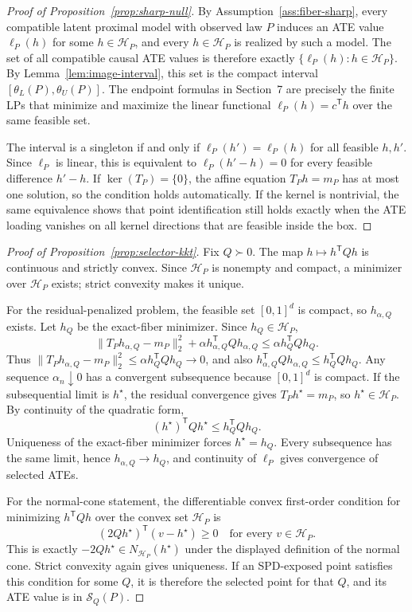 \documentclass[11pt]{article}
\newcommand{\transpose}{\mathsf{T}}
\newcommand{\calH}{\mathcal{H}}
\theoremstyle{definition}
\theoremstyle{plain}
\theoremstyle{remark}
\begin{document}
\begin{proof}[Proof of Proposition~\ref{prop:sharp-null}]
By Assumption~\ref{ass:fiber-sharp}, every compatible latent proximal model
with observed law \(P\) induces an ATE value \(\ell_P(h)\) for some
\(h\in\calH_P\), and every \(h\in\calH_P\) is realized by such a model.  The
set of all compatible causal ATE values is therefore exactly
\(\{\ell_P(h):h\in\calH_P\}\).  By Lemma~\ref{lem:image-interval}, this set
is the compact interval \([\theta_L(P),\theta_U(P)]\).  The endpoint formulas
in Section~7 are precisely the finite LPs that minimize and maximize the
linear functional \(\ell_P(h)=c^\transpose h\) over the same feasible set.

The interval is a singleton if and only if \(\ell_P(h')=\ell_P(h)\) for all
feasible \(h,h'\).  Since \(\ell_P\) is linear, this is equivalent to
\(\ell_P(h'-h)=0\) for every feasible difference \(h'-h\).  If
\(\ker(T_P)=\{0\}\), the affine equation \(T_Ph=m_P\) has at most one
solution, so the condition holds automatically.  If the kernel is nontrivial,
the same equivalence shows that point identification still holds exactly
when the ATE loading vanishes on all kernel directions that are feasible
inside the box.
\end{proof}

\begin{proof}[Proof of Proposition~\ref{prop:selector-kkt}]
Fix \(Q\succ0\).  The map \(h\mapsto h^\transpose Qh\) is continuous and
strictly convex.  Since \(\calH_P\) is nonempty and compact, a minimizer over
\(\calH_P\) exists; strict convexity makes it unique.

For the residual-penalized problem, the feasible set \([0,1]^d\) is compact,
so \(h_{\alpha,Q}\) exists.  Let \(h_Q\) be the exact-fiber minimizer.  Since
\(h_Q\in\calH_P\),
\[
  \|T_Ph_{\alpha,Q}-m_P\|_2^2+\alpha h_{\alpha,Q}^\transpose Qh_{\alpha,Q}
  \le
  \alpha h_Q^\transpose Qh_Q .
\]
Thus \(\|T_Ph_{\alpha,Q}-m_P\|_2^2\le\alpha h_Q^\transpose Qh_Q\to0\), and
also \(h_{\alpha,Q}^\transpose Qh_{\alpha,Q}\le h_Q^\transpose Qh_Q\).  Any
sequence \(\alpha_n\downarrow0\) has a convergent subsequence because
\([0,1]^d\) is compact.  If the subsequential limit is \(h^\star\), the
residual convergence gives \(T_Ph^\star=m_P\), so \(h^\star\in\calH_P\).  By
continuity of the quadratic form,
\[
  (h^\star)^\transpose Qh^\star\le h_Q^\transpose Qh_Q.
\]
Uniqueness of the exact-fiber minimizer forces \(h^\star=h_Q\).  Every
subsequence has the same limit, hence \(h_{\alpha,Q}\to h_Q\), and continuity
of \(\ell_P\) gives convergence of selected ATEs.

For the normal-cone statement, the differentiable convex first-order
condition for minimizing \(h^\transpose Qh\) over the convex set \(\calH_P\)
is
\[
  (2Qh^\star)^\transpose(v-h^\star)\ge0
  \quad\text{for every }v\in\calH_P.
\]
This is exactly \(-2Qh^\star\in N_{\calH_P}(h^\star)\) under the displayed
definition of the normal cone.  Strict convexity again gives uniqueness.  If
an SPD-exposed point satisfies this condition for some \(Q\), it is therefore
the selected point for that \(Q\), and its ATE value is in
\(\mathcal S_Q(P)\).
\end{proof}
\end{document}
